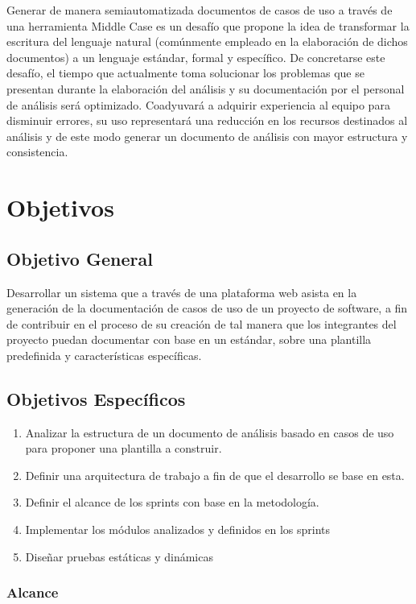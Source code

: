 Generar de manera semiautomatizada documentos de casos de uso a través  de una herramienta Middle Case es un desafío que propone la idea de transformar la escritura del lenguaje natural (comúnmente empleado en la elaboración de dichos documentos) a un lenguaje estándar, formal y específico. De concretarse este desafío, el tiempo que actualmente toma solucionar los problemas que se presentan durante la elaboración del análisis y su documentación por el  personal de análisis será optimizado. Coadyuvará a adquirir experiencia al equipo para  disminuir errores, su uso representará una reducción en los recursos destinados al análisis y de este modo generar un documento de análisis  con mayor estructura y consistencia.
\newpage
\section{Objetivos}
\subsection{Objetivo General}
Desarrollar un sistema que a través de una plataforma web asista en la generación de la documentación de casos de uso de un proyecto de software, a fin de contribuir en el proceso de su creación de tal manera que los integrantes del proyecto puedan documentar con base en un estándar, sobre una plantilla predefinida y características específicas.

\subsection{Objetivos Específicos}

\begin{enumerate}
	\item Analizar la estructura de un documento de análisis basado en casos de uso para proponer una plantilla a construir.
	\item Definir una arquitectura de trabajo a fin de que el desarrollo se base en esta.
	\item Definir el alcance de los sprints con base en la metodología.
	\item Implementar los módulos analizados y definidos en los sprints
	\item Diseñar pruebas estáticas y dinámicas
\end{enumerate}

\subsubsection{Alcance}

